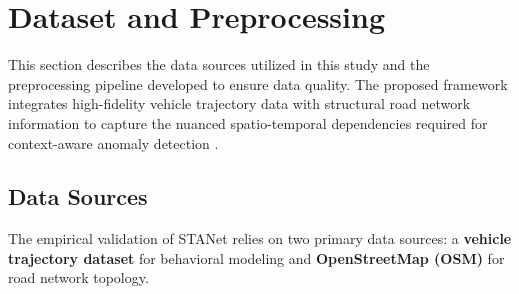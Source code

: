 \documentclass[journal]{IEEEtran}
\begin{document}
\begin{table}[!htbp]
  \centering
  \caption{Summary of sample-wise scalar modality-gating configuration}
  \label{tab:fusion_config}
  \renewcommand{\arraystretch}{1.15}
\end{table}

\section{Dataset and Preprocessing}

This section describes the data sources utilized in this study and the preprocessing pipeline developed to ensure data quality. The proposed framework integrates high-fidelity vehicle trajectory data with structural road network information to capture the nuanced spatio-temporal dependencies required for context-aware anomaly detection \cite{zhang_automatic_2022, zhang_traffic_2025}.

\subsection{Data Sources}
The empirical validation of STANet relies on two primary data sources: a \textbf{vehicle trajectory dataset} for behavioral modeling and \textbf{OpenStreetMap (OSM)} for road network topology.
\end{document}
